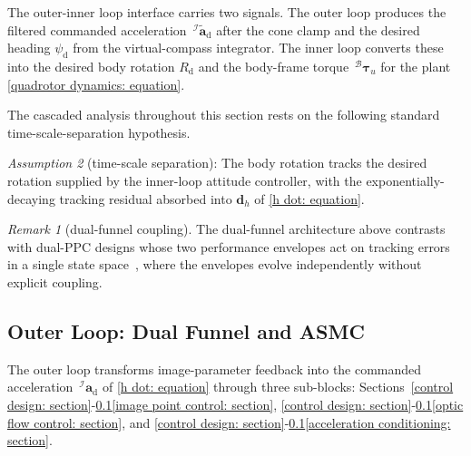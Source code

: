 \documentclass{IEEEtaes}
\begin{document}
The outer-inner loop interface carries two signals. The outer loop produces the filtered commanded acceleration $\,^\mathcal{I}\tilde{\boldsymbol{a}}_\text{d}$ after the cone clamp and the desired heading $\psi_\text{d}$ from the virtual-compass integrator. The inner loop converts these into the desired body rotation $R_\text{d}$ and the body-frame torque $\,^\mathcal{B}\boldsymbol{\tau}_u$ for the plant \eqref{quadrotor dynamics: equation}.

The cascaded analysis throughout this section rests on the following standard time-scale-separation hypothesis.

\textit{Assumption 2} (time-scale separation): The body rotation tracks the desired rotation supplied by the inner-loop attitude controller, with the exponentially-decaying tracking residual absorbed into $\boldsymbol{d}_h$ of \eqref{h dot: equation}.

\textit{Remark 1} (dual-funnel coupling). The dual-funnel architecture above contrasts with dual-PPC designs whose two performance envelopes act on tracking errors in a single state space~\cite{lin2022}, where the envelopes evolve independently without explicit coupling.

\subsection{Outer Loop: Dual Funnel and ASMC} \label{outer loop: section}
The outer loop transforms image-parameter feedback into the commanded acceleration $\,^\mathcal{I}\boldsymbol{a}_\text{d}$ of \eqref{h dot: equation} through three sub-blocks: Sections~\ref{control design: section}-\ref{outer loop: section}\ref{image point control: section}, \ref{control design: section}-\ref{outer loop: section}\ref{optic flow control: section}, and \ref{control design: section}-\ref{outer loop: section}\ref{acceleration conditioning: section}.
\end{document}
